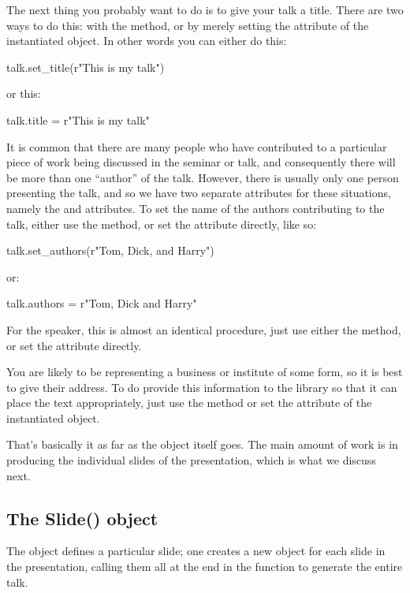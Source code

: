The next thing you probably want to do is to give your talk a title.  There
are two ways to do this: with the  method, or by merely
setting the  attribute of the instantiated  object.
In other words you can either do this:
\begin{python}
talk.set_title(r"This is my talk")
\end{python}
or this:
\begin{python}
talk.title = r"This is my talk"
\end{python}

It is common that there are many people who have contributed to a particular
piece of work being discussed in the seminar or talk, and consequently there
will be more than one ``author'' of the talk.  However, there is usually
only one person presenting the talk, and so we have two separate attributes
for these situations, namely the  and  attributes.
To set the name of the authors contributing to the talk, either use the
 method, or set the attribute directly, like so:
\begin{python}
talk.set_authors(r"Tom, Dick, and Harry")
\end{python}
or:
\begin{python}
talk.authors = r"Tom, Dick and Harry"
\end{python}
For the speaker, this is almost an identical procedure, just use either the
 method, or set the  attribute directly.

You are likely to be representing a business or institute of some form, so
it is best to give their address.  To do provide this information to the
 library so that it can place the text appropriately, just
use the  method or set the  attribute of
the instantiated  object.

That's basically it as far as the  object itself goes.  The main
amount of work is in producing the individual slides of the presentation,
which is what we discuss next.

\subsection{The Slide() object}

The  object defines a particular slide; one creates a new
 object for each slide in the presentation, calling them all at
the end in the  function to generate the entire talk.  

